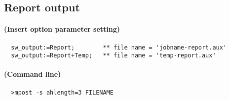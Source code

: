 \documentclass[a4paper]{article}
\begin{document}
\subsection{Report output}
\paragraph{(Insert option parameter setting)}
%
%
\begin{verbatim}
  sw_output:=Report;        ** file name = 'jobname-report.aux'
  sw_output:=Report+Temp;   ** file name = 'temp-report.aux'
\end{verbatim}
\paragraph{(Command line)}
\begin{verbatim}
  >mpost -s ahlength=3 FILENAME
\end{verbatim}
\end{document}
